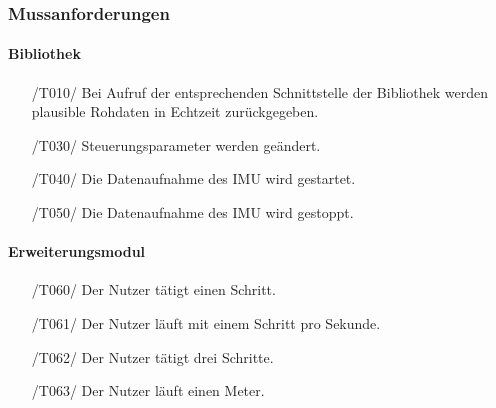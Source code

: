 \documentclass[a4paper,12pt]{article}
\begin{document}
  \subsubsection{Mussanforderungen}
  \paragraph{Bibliothek}
  \begin{itemize}
    \item[/T010/] Bei Aufruf der entsprechenden Schnittstelle der Bibliothek werden plausible Rohdaten in \Gls{Echtzeit} zurückgegeben.
    \item[/T030/] Steuerungsparameter werden geändert. 
    \item[/T040/] Die Datenaufnahme des \Gls{IMU} wird gestartet.
    \item[/T050/] Die Datenaufnahme des \Gls{IMU} wird gestoppt.
  \end{itemize}
  \paragraph{Erweiterungsmodul}
  \begin{itemize}
    \item[/T060/] Der Nutzer tätigt einen Schritt.
    \item[/T061/] Der Nutzer läuft mit einem Schritt pro Sekunde.
    \item[/T062/] Der Nutzer tätigt drei Schritte.
    \item[/T063/] Der Nutzer läuft einen Meter.
  \end{itemize}
\end{document}
